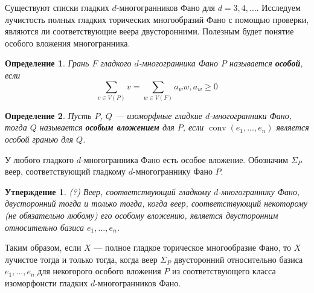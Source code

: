 \documentclass[12pt,notitlepage]{article}
\DeclareMathOperator{\conv}{conv}
\newtheorem{definition}{Определение}
\newtheorem{statement}{Утверждение}
\begin{document}
	Существуют списки гладких $d$-многогранников Фано для $d = 3, 4, ...$. Исследуем лучистость полных гладких торических многообразий Фано с помощью проверки, являются ли соответствующие веера двусторонними. Полезным будет понятие особого вложения многогранника.
	
	\begin{definition}
		Грань $F$ гладкого $d$-многогранника Фано $P$ называется \textbf{особой}, если
		\[
		\sum_{v \in V(P)} v = \sum_{w \in V(F)} a_w w, a_w \geq 0
		\]
	\end{definition} 
	\begin{definition}
		Пусть $P$, $Q$ --- изоморфные гладкие $d$-многогранники Фано, тогда $Q$ называется \textbf{особым вложением} для $P$, если $\conv (e_1, ..., e_n)$ является особой гранью для $Q$.
	\end{definition}
	
	У любого гладкого $d$-многогранника Фано есть особое вложение. Обозначим $\Sigma_P$ веер, соответствующий гладкому $d$-многограннику Фано $P$.
	
	\begin{statement}(?)
		Веер, соответствующий гладкому $d$-многограннику Фано, двусторонний тогда и только тогда, когда веер, соответствующий некоторому (не обязательно любому) его особому вложению, является двусторонним относительно базиса $e_1, ..., e_n$.
	\end{statement}
	
	Таким образом, если $X$ --- полное гладкое торическое многообразие Фано, то $X$ лучистое тогда и только тогда, когда веер $\Sigma_P$ двусторонний относительно базиса $e_1, ..., e_n$ для некогорого особого вложения $P$ из соответствующего класса изоморфонсти гладких $d$-многогранников Фано.
\end{document}
